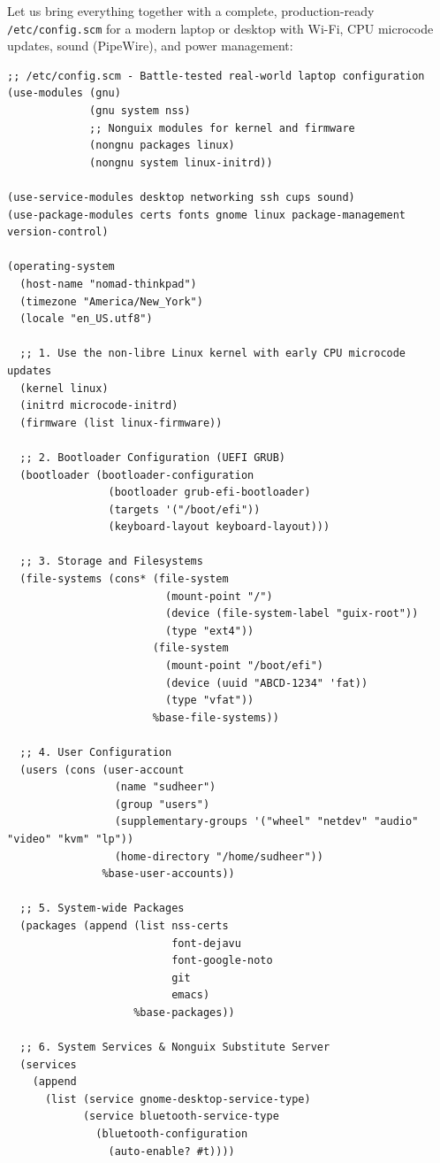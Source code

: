 Let us bring everything together with a complete, production-ready \texttt{/etc/config.scm} for a modern laptop or desktop with Wi-Fi, CPU microcode updates, sound (PipeWire), and power management:

\begin{lstlisting}[style=guixscheme]
;; /etc/config.scm - Battle-tested real-world laptop configuration
(use-modules (gnu)
             (gnu system nss)
             ;; Nonguix modules for kernel and firmware
             (nongnu packages linux)
             (nongnu system linux-initrd))

(use-service-modules desktop networking ssh cups sound)
(use-package-modules certs fonts gnome linux package-management version-control)

(operating-system
  (host-name "nomad-thinkpad")
  (timezone "America/New_York")
  (locale "en_US.utf8")

  ;; 1. Use the non-libre Linux kernel with early CPU microcode updates
  (kernel linux)
  (initrd microcode-initrd)
  (firmware (list linux-firmware))

  ;; 2. Bootloader Configuration (UEFI GRUB)
  (bootloader (bootloader-configuration
                (bootloader grub-efi-bootloader)
                (targets '("/boot/efi"))
                (keyboard-layout keyboard-layout)))

  ;; 3. Storage and Filesystems
  (file-systems (cons* (file-system
                         (mount-point "/")
                         (device (file-system-label "guix-root"))
                         (type "ext4"))
                       (file-system
                         (mount-point "/boot/efi")
                         (device (uuid "ABCD-1234" 'fat))
                         (type "vfat"))
                       %base-file-systems))

  ;; 4. User Configuration
  (users (cons (user-account
                 (name "sudheer")
                 (group "users")
                 (supplementary-groups '("wheel" "netdev" "audio" "video" "kvm" "lp"))
                 (home-directory "/home/sudheer"))
               %base-user-accounts))

  ;; 5. System-wide Packages
  (packages (append (list nss-certs
                          font-dejavu
                          font-google-noto
                          git
                          emacs)
                    %base-packages))

  ;; 6. System Services & Nonguix Substitute Server
  (services
    (append
      (list (service gnome-desktop-service-type)
            (service bluetooth-service-type
              (bluetooth-configuration
                (auto-enable? #t))))


\end{lstlisting}
